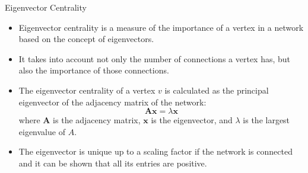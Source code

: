 \documentclass[9pt,handout]{beamer}
\let\olditem\item
\renewcommand{\item}{\olditem\vfill}
\begin{document}
\begin{frame}{Eigenvector Centrality}
  \begin{itemize}
    \item Eigenvector centrality is a measure of the importance of a vertex in a network based on the concept of eigenvectors.
    \item It takes into account not only the number of connections a vertex has, but also the importance of those connections.
    \item The eigenvector centrality of a vertex $v$ is calculated as the principal eigenvector of the adjacency matrix of the network:
    \[
    \mathbf{Ax} = \lambda \mathbf{x}
    \]
    where $\mathbf{A}$ is the adjacency matrix, $\mathbf{x}$ is the eigenvector, and $\lambda$ is the largest eigenvalue of $A$.
    \item The eigenvector is unique up to a scaling factor if the network is connected and it can be shown that all its entries are positive.
  \end{itemize}
\end{frame}
\end{document}
